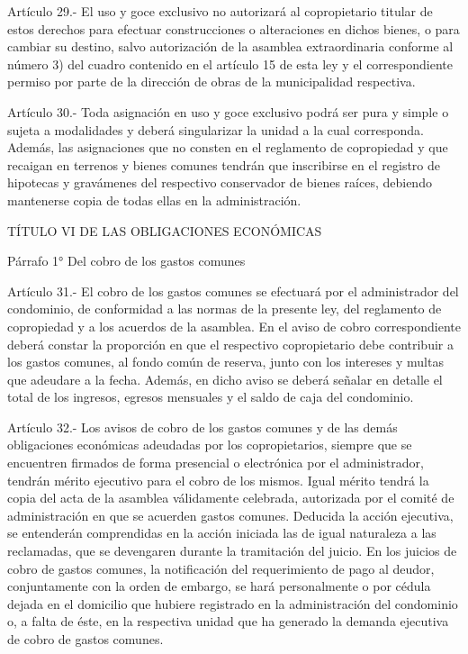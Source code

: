     Artículo 29.- El uso y goce exclusivo no autorizará al copropietario titular de estos derechos para efectuar construcciones o alteraciones en dichos bienes, o para cambiar su destino, salvo autorización de la asamblea extraordinaria conforme al número 3) del cuadro contenido en el artículo 15 de esta ley y el correspondiente permiso por parte de la dirección de obras de la municipalidad respectiva.
     
    Artículo 30.- Toda asignación en uso y goce exclusivo podrá ser pura y simple o sujeta a modalidades y deberá singularizar la unidad a la cual corresponda. Además, las asignaciones que no consten en el reglamento de copropiedad y que recaigan en terrenos y bienes comunes tendrán que inscribirse en el registro de hipotecas y gravámenes del respectivo conservador de bienes raíces, debiendo mantenerse copia de todas ellas en la administración.

    TÍTULO VI
    DE LAS OBLIGACIONES ECONÓMICAS


    Párrafo 1°
    Del cobro de los gastos comunes

     
    Artículo 31.- El cobro de los gastos comunes se efectuará por el administrador del condominio, de conformidad a las normas de la presente ley, del reglamento de copropiedad y a los acuerdos de la asamblea. En el aviso de cobro correspondiente deberá constar la proporción en que el respectivo copropietario debe contribuir a los gastos comunes, al fondo común de reserva, junto con los intereses y multas que adeudare a la fecha. Además, en dicho aviso se deberá señalar en detalle el total de los ingresos, egresos mensuales y el saldo de caja del condominio.
     
    Artículo 32.- Los avisos de cobro de los gastos comunes y de las demás obligaciones económicas adeudadas por los copropietarios, siempre que se encuentren firmados de forma presencial o electrónica por el administrador, tendrán mérito ejecutivo para el cobro de los mismos. Igual mérito tendrá la copia del acta de la asamblea válidamente celebrada, autorizada por el comité de administración en que se acuerden gastos comunes.
    Deducida la acción ejecutiva, se entenderán comprendidas en la acción iniciada las de igual naturaleza a las reclamadas, que se devengaren durante la tramitación del juicio.
    En los juicios de cobro de gastos comunes, la notificación del requerimiento de pago al deudor, conjuntamente con la orden de embargo, se hará personalmente o por cédula dejada en el domicilio que hubiere registrado en la administración del condominio o, a falta de éste, en la respectiva unidad que ha generado la demanda ejecutiva de cobro de gastos comunes.
     
